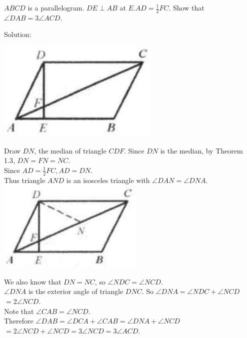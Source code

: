 \documentclass{article}
\begin{document}
\(A B C D\) is a parallelogram. \(D E \perp A B\) at \(E . A D=\frac{1}{2} F C\). Show that \(\angle D A B=3 \angle A C D\).

Solution:
\begin{center}
\includegraphics[width=\textwidth]{images/012(1).jpg}
\end{center}

Draw \(D N\), the median of triangle \(C D F\). Since \(D N\) is the median, by Theorem 1.3, \(D N=F N=N C\).\\
Since \(A D=\frac{1}{2} F C, A D=D N\).\\
Thus triangle \(A N D\) is an isosceles triangle with \(\angle D A N=\angle D N A\).\\
\centering
\includegraphics[width=\textwidth]{images/012(2).jpg}

We also know that \(D N=N C\), so \(\angle N D C=\angle N C D\).\\
\(\angle D N A\) is the exterior angle of triangle \(D N C\). So \(\angle D N A=\angle N D C+\angle N C D\)\\
\(=2 \angle N C D\).\\
Note that \(\angle C A B=\angle N C D\).\\
Therefore \(\angle D A B=\angle D C A+\angle C A B=\angle D N A+\angle N C D\)\\
\(=2 \angle N C D+\angle N C D=3 \angle N C D=3 \angle A C D\).
\end{document}
